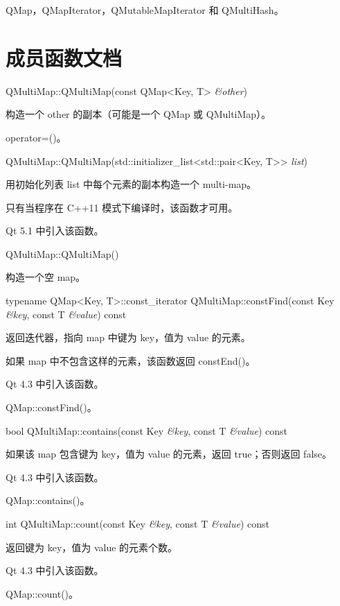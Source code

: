 \begin{seeAlso}
QMap，QMapIterator，QMutableMapIterator 和 QMultiHash。
\end{seeAlso}

\section{成员函数文档}

QMultiMap::QMultiMap(const QMap<Key, T> \emph{\&other})

构造一个 other 的副本（可能是一个 QMap 或 QMultiMap）。

\begin{seeAlso}
operator=()。
\end{seeAlso}

QMultiMap::QMultiMap(std::initializer\_list<std::pair<Key, T>> \emph{list})

用初始化列表 list 中每个元素的副本构造一个 multi-map。

只有当程序在 C++11 模式下编译时，该函数才可用。

Qt 5.1 中引入该函数。

QMultiMap::QMultiMap()

构造一个空 map。

typename QMap<Key, T>::const\_iterator QMultiMap::constFind(const Key \emph{\&key}, const T \emph{\&value}) const

返回迭代器，指向 map 中键为 key，值为 value 的元素。

如果 map 中不包含这样的元素，该函数返回 constEnd()。

Qt 4.3 中引入该函数。

\begin{seeAlso}
QMap::constFind()。
\end{seeAlso}

bool QMultiMap::contains(const Key \emph{\&key}, const T \emph{\&value}) const

如果该 map 包含键为 key，值为 value 的元素，返回 true；否则返回 false。

Qt 4.3 中引入该函数。

\begin{seeAlso}
QMap::contains()。
\end{seeAlso}

int QMultiMap::count(const Key \emph{\&key}, const T  \emph{\&value}) const

返回键为 key，值为 value 的元素个数。

Qt 4.3 中引入该函数。

\begin{seeAlso}
QMap::count()。
\end{seeAlso}

